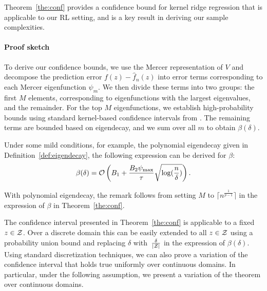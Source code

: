 Theorem~\ref{the:conf} provides a confidence bound for kernel ridge regression that is applicable to our RL setting, and is a key result in deriving our sample complexities. 

\paragraph{Proof sketch}
To derive our confidence bounds, we use the Mercer representation of \( V \) and decompose the prediction error \( f(z) - \hat{f}_n(z) \) into error terms corresponding to each Mercer eigenfunction \( \psi_m \). We then divide these terms into two groups: the first \( M \) elements, corresponding to eigenfunctions with the largest eigenvalues, and the remainder. For the top \( M \) eigenfunctions, we establish high-probability bounds using standard kernel-based confidence intervals from \cite{vakili2021optimal}. The remaining terms are bounded based on eigendecay, and we sum over all \( m \) to obtain \( \beta(\delta) \).
\begin{remark}
    Under some mild conditions, for example, the polynomial eigendecay given in Definition~\ref{def:eigendecay}, the following expression can be derived for $\beta$:
    \begin{equation}
        \beta(\delta)= \mathcal{O}\left(B_1+\frac{ B_2 \psi_{\max} }{\tau}\sqrt{\log(\frac{n}{\delta})}\right).
    \end{equation}
\end{remark}

With polynomial eigendecay, the remark follows from setting $M$ to $\lceil n^{\frac{1}{p-1}}\rceil 
$ in the expression of $\beta$ in Theorem~\ref{the:conf}.

The confidence interval presented in Theorem~\ref{the:conf} is applicable to a fixed $z\in\mathcal{Z}$. Over a discrete domain this can be easily extended to all $z\in\mathcal{Z}$ using a probability union bound and replacing $\delta$ with~$\frac{\delta}{|\mathcal{Z}|}$ in the expression of $\beta(\delta)$. Using standard discretization techniques, we can also prove a variation of the confidence interval that holds true uniformly over continuous domains. In particular, under the following assumption, we present a variation of the theorem over continuous domains. 


